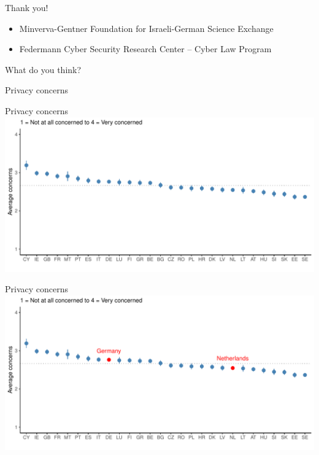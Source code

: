 \documentclass[
  ignorenonframetext,
]{beamer}
\begin{document}
\begin{frame}{Thank you!}
\protect\hypertarget{thank-you}{}
\begin{itemize}
\item
  Minverva-Gentner Foundation for Israeli-German Science Exchange
\item
  Federmann Cyber Security Research Center -- Cyber Law Program
\end{itemize}
\end{frame}

\begin{frame}{What do you think?}
\protect\hypertarget{what-do-you-think}{}
\end{frame}

\begin{frame}{Privacy concerns}
\protect\hypertarget{privacy-concerns}{}
\end{frame}

\begin{frame}{Privacy concerns}
\protect\hypertarget{privacy-concerns-1}{}
\includegraphics{slides_files/figure-beamer/unnamed-chunk-2-1.pdf}
\end{frame}

\begin{frame}{Privacy concerns}
\protect\hypertarget{privacy-concerns-2}{}
\includegraphics{slides_files/figure-beamer/unnamed-chunk-3-1.pdf}
\end{frame}
\end{document}
